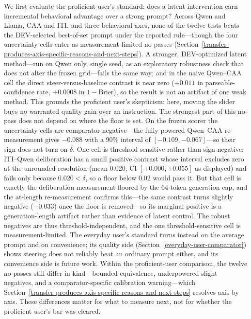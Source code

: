 \documentclass[manuscript,review,anonymous]{acmart}
\begin{document}
We first evaluate the proficient user's standard: does a latent intervention earn incremental behavioral advantage over a strong prompt? Across Qwen and Llama, CAA and ITI, and three behavioral axes, none of the twelve tests beats the DEV-selected best-of-set prompt under the reported rule---though the four uncertainty cells enter as measurement-limited no-passes (Section~\ref{transfer-produces-axis-specific-reasons-and-next-steps}). A stronger, DEV-optimized latent method---run on Qwen only, single seed, as an exploratory robustness check that does not alter the frozen grid---fails the same way; and in the naive Qwen--CAA cell the direct steer-versus-baseline contrast is near zero (\(+0.011\) in parseable-confidence rate, \(+0.0008\) in \(1-\mathrm{Brier}\)), so the result is not an artifact of one weak method. This grounds the proficient user's skepticism: here, moving the slider buys no warranted quality gain over an instruction. {}%
{}%
{}%
The strongest part of this no-pass does not depend on where the floor is set. On the frozen scorer the uncertainty cells are comparator-negative---the fully powered Qwen--CAA re-measurement gives \(-0.088\) with a 90\% interval of \([-0.109,-0.067]\)---so their sign does not turn on \(\delta\). One cell is threshold-sensitive rather than sign-negative: ITI--Qwen deliberation has a small positive contrast whose interval excludes zero at the unrounded resolution (mean \(0.020\), CI \([+0.000,+0.055]\) as displayed) and fails only because \(0.020<\delta\), so a floor below \(0.02\) would pass it. But that cell is exactly the deliberation measurement floored by the 64-token generation cap, and the at-length re-measurement confirms this---the same contrast turns slightly negative (\(-0.033\)) once the floor is removed---so its marginal positive is a generation-length artifact rather than evidence of latent control. The robust negatives are thus threshold-independent, and the one threshold-sensitive cell is measurement-limited.
The everyday user's standard turns instead on the average prompt and on convenience; its quality side (Section~\ref{everyday-user-comparator}) shows steering does not reliably beat an ordinary prompt either, and its convenience side is future work. Within the proficient-user comparison, the twelve no-passes still differ in kind---bounded equivalence, underpowered slight negatives, and a comparator-specific calibration warning---which Section~\ref{transfer-produces-axis-specific-reasons-and-next-steps} resolves axis by axis. These differences matter for what to measure next, not for whether the proficient user's bar was cleared.
\end{document}

